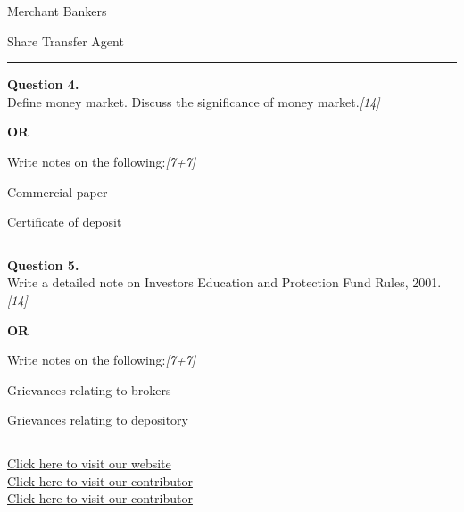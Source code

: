 \documentclass[11pt,a4paper]{article}
\newcommand{\pts}[1]{\hfill   \textit{[#1]}}
\begin{document}
\begin{parts}
  \item Merchant Bankers
  \item Share Transfer Agent
\end{parts}

\medskip\rule{\linewidth}{0.2pt}




\noindent   \textbf{Question 4.} \\
Define money market. Discuss the significance of money market.\pts{14}

\centerline{   \textbf{OR}}

Write notes on the following:\pts{7+7}

\begin{parts}
  \item Commercial paper
  \item Certificate of deposit
\end{parts}

\medskip\rule{\linewidth}{0.2pt}




\noindent   \textbf{Question 5.} \\
Write a detailed note on Investors Education and Protection Fund Rules, 2001.\pts{14}

\centerline{   \textbf{OR}}

Write notes on the following:\pts{7+7}

\begin{parts}
  \item Grievances relating to brokers
  \item Grievances relating to depository
\end{parts}

\vfill
\rule{\linewidth}{0.4pt}

\begin{center}\small
\href{https://bhu-exam.vercel.app/}{Click here to visit our website}\\[4pt]
\href{https://me-aryan.vercel.app/}{Click here to visit our contributor}\\[4pt]
\href{https://quashan-me.vercel.app/}{Click here to visit our contributor}
\end{center}
\end{document}
